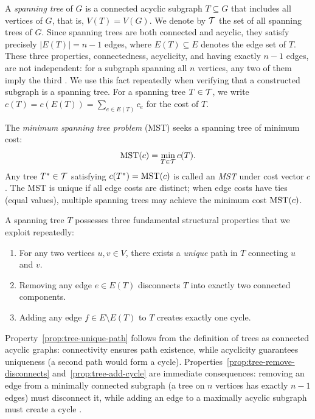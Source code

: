 A \emph{\textcolor{RWTHBlue}{spanning tree}} of $G$ is a connected acyclic subgraph $T \subseteq G$ that includes all vertices of $G$, that is, $V(T) = V(G)$.
We denote by $\mathcal{T}$ the set of all spanning trees of $G$.
Since spanning trees are both connected and acyclic, they satisfy precisely $|E(T)| = n - 1$ edges, where $E(T) \subseteq E$ denotes the edge set of $T$.
These three properties, connectedness, acyclicity, and having exactly $n - 1$ edges, are not independent: for a subgraph spanning all $n$ vertices, any two of them imply the third \cite[Theorem~2.1]{KorteVygen2018}.
We use this fact repeatedly when verifying that a constructed subgraph is a spanning tree.
For a spanning tree $T \in \mathcal{T}$, we write $c(T) = c(E(T)) = \sum_{e \in E(T)} c_e$ for the cost of $T$.

The \emph{\textcolor{RWTHBlue}{minimum spanning tree problem}} (MST) seeks a spanning tree of minimum cost:
\begin{equation}\label{eq:mst-definition}
\mathrm{MST}(c) = \min_{T \in \mathcal{T}} c(T).
\end{equation}
Any tree $T^* \in \mathcal{T}$ satisfying $c(T^*) = \mathrm{MST}(c)$ is called an \emph{MST} under cost vector $c$.
The MST is unique if all edge costs are distinct; when edge costs have ties (equal values), multiple spanning trees may achieve the minimum cost $\mathrm{MST}(c)$.

A spanning tree $T$ possesses three fundamental structural properties that we exploit repeatedly:

\begin{enumerate}[label=\textbf{(P\arabic*)},ref=P\arabic*]
\item\label{prop:tree-unique-path} For any two vertices $u, v \in V$, there exists a \emph{unique} path in $T$ connecting $u$ and $v$.
\item\label{prop:tree-remove-disconnects} Removing any edge $e \in E(T)$ disconnects $T$ into exactly two connected components.
\item\label{prop:tree-add-cycle} Adding any edge $f \in E \setminus E(T)$ to $T$ creates exactly one cycle.
\end{enumerate}

Property~\ref{prop:tree-unique-path} follows from the definition of trees as connected acyclic graphs: connectivity ensures path existence, while acyclicity guarantees uniqueness (a second path would form a cycle).
Properties~\ref{prop:tree-remove-disconnects} and~\ref{prop:tree-add-cycle} are immediate consequences: removing an edge from a minimally connected subgraph (a tree on $n$ vertices has exactly $n-1$ edges) must disconnect it, while adding an edge to a maximally acyclic subgraph must create a cycle \cite[Theorem~2.1]{KorteVygen2018}.

